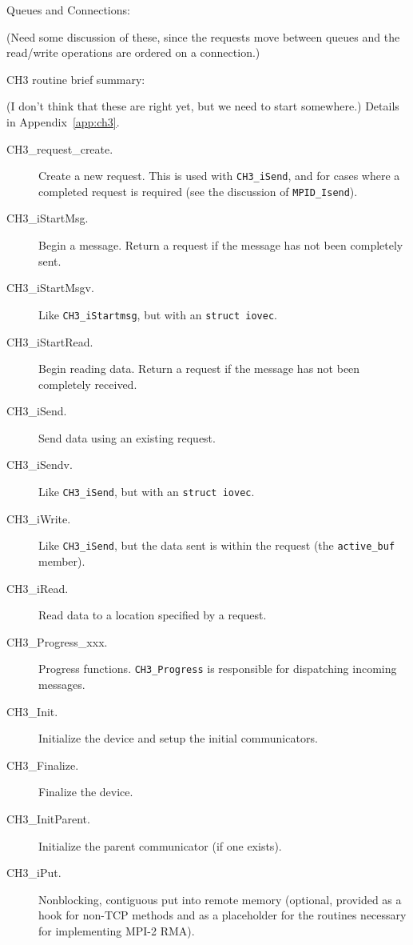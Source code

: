 \documentclass{article}
\def\mpids#1#2{\code{#2}\index{#1!#2}}
\def\code{\begingroup\makeustext\eatcode}
\def\eatcode#1{\texttt{#1}\endgroup}
\begin{document}
Queues and Connections:

(Need some discussion of these, since the requests move between queues and the 
read/write operations are ordered on a connection.)

CH3 routine brief summary:

(I don't think that these are right yet, but we need to start somewhere.)
Details in Appendix~\ref{app:ch3}.

\begin{description}
\item[CH3\_request\_create.]Create a new request. This is used with
  \code{CH3_iSend}, and for cases where a completed request is required (see
  the discussion of \code{MPID_Isend}).
\item[CH3\_iStartMsg.]Begin a message.  Return a request if the message has not
  been completely sent.
\item[CH3\_iStartMsgv.]Like \code{CH3_iStartmsg}, but with an \code{struct
    iovec}.
\item[CH3\_iStartRead.]Begin reading data.  Return a request if the message has
  not been completely received.
\item[CH3\_iSend.]Send data using an existing request.
\item[CH3\_iSendv.]Like \code{CH3_iSend}, but with an \code{struct iovec}.
\item[CH3\_iWrite.]Like \code{CH3_iSend}, but the data sent is within the
  request (the \mpids{MPID_Request}{active\_buf} member).
\item[CH3\_iRead.]Read data to a location specified by a request.
\item[CH3\_Progress\_xxx.]Progress functions.  \code{CH3_Progress} is
  responsible for dispatching incoming messages.
\item[CH3\_Init.]Initialize the device and setup the initial communicators.
\item[CH3\_Finalize.]Finalize the device.
\item[CH3\_InitParent.]Initialize the parent communicator (if one exists).
\item[CH3\_iPut.]Nonblocking, contiguous put into remote memory (optional,
  provided as a hook for non-TCP methods and as a placeholder for the
  routines necessary for implementing MPI-2 RMA).
\end{description}
\end{document}
